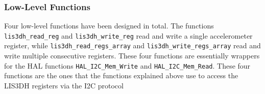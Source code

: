 \subsubsection{Low-Level Functions}

Four low-level functions have been designed in total. The functions \\
\texttt{lis3dh\_read\_reg} and \texttt{lis3dh\_write\_reg} read and write a single 
accelerometer register, while \texttt{lis3dh\_read\_regs\_array} and 
\texttt{lis3dh\_write\_regs\_array} read and write multiple consecutive registers. 
These four functions are essentially wrappers for the HAL functions 
\texttt{HAL\_I2C\_Mem\_Write} and \texttt{HAL\_I2C\_Mem\_Read}. These four functions are the ones that the functions explained above use to access the LIS3DH registers via the I2C protocol
